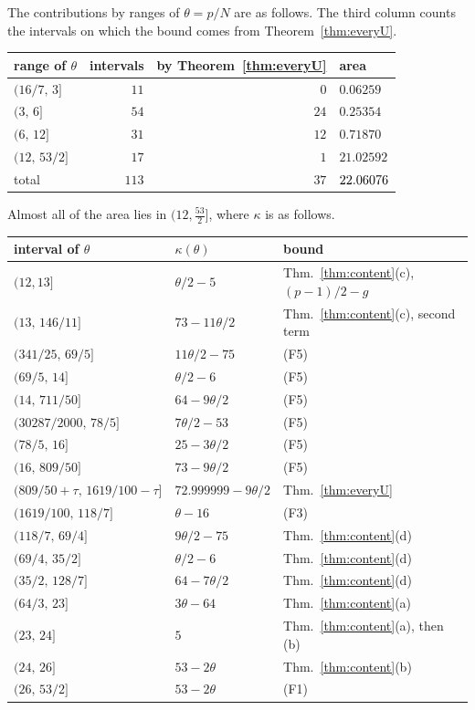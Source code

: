 The contributions by ranges of $\theta=p/N$ are as follows. The third column counts the intervals on which
the bound comes from Theorem~\ref{thm:everyU}.
\begin{center}
\begin{tabular}{@{}lrrl@{}}
\toprule
range of $\theta$ & intervals & by Theorem~\ref{thm:everyU} & area \\
\midrule
$(16/7,\,3]$ & $11$ & $0$ & $0.06259$ \\
$(3,\,6]$ & $54$ & $24$ & $0.25354$ \\
$(6,\,12]$ & $31$ & $12$ & $0.71870$ \\
$(12,\,53/2]$ & $17$ & $1$ & $21.02592$ \\
\midrule
total & $113$ & $37$ & $22.06076$ \\
\bottomrule
\end{tabular}
\end{center}
Almost all of the area lies in $(12,\frac{53}2]$, where $\kappa$ is as follows.
\begin{center}
\begin{tabular}{@{}lll@{}}
\toprule
interval of $\theta$ & $\kappa(\theta)$ & bound \\
\midrule
$(12,13]$ & $\theta/2-5$ & Thm.~\ref{thm:content}(c), $(p-1)/2-g$ \\
$(13,\,146/11]$ & $73-11\theta/2$ & Thm.~\ref{thm:content}(c), second term \\
$(341/25,\,69/5]$ & $11\theta/2-75$ & (F5) \\
$(69/5,\,14]$ & $\theta/2-6$ & (F5) \\
$(14,\,711/50]$ & $64-9\theta/2$ & (F5) \\
$(30287/2000,\,78/5]$ & $7\theta/2-53$ & (F5) \\
$(78/5,\,16]$ & $25-3\theta/2$ & (F5) \\
$(16,\,809/50]$ & $73-9\theta/2$ & (F5) \\
$(809/50+\tau,\,1619/100-\tau]$ & $72.999999-9\theta/2$ & Thm.~\ref{thm:everyU} \\
$(1619/100,\,118/7]$ & $\theta-16$ & (F3) \\
$(118/7,\,69/4]$ & $9\theta/2-75$ & Thm.~\ref{thm:content}(d) \\
$(69/4,\,35/2]$ & $\theta/2-6$ & Thm.~\ref{thm:content}(d) \\
$(35/2,\,128/7]$ & $64-7\theta/2$ & Thm.~\ref{thm:content}(d) \\
$(64/3,\,23]$ & $3\theta-64$ & Thm.~\ref{thm:content}(a) \\
$(23,\,24]$ & $5$ & Thm.~\ref{thm:content}(a), then (b) \\
$(24,\,26]$ & $53-2\theta$ & Thm.~\ref{thm:content}(b) \\
$(26,\,53/2]$ & $53-2\theta$ & (F1) \\
\bottomrule
\end{tabular}
\end{center}
